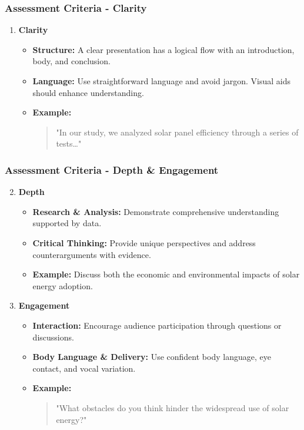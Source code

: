\documentclass[aspectratio=169]{beamer}
\begin{document}
\begin{frame}[fragile]
    \frametitle{Assessment Criteria - Clarity}
    \begin{enumerate}
        \item \textbf{Clarity}  
        \begin{itemize}
            \item \textbf{Structure:} A clear presentation has a logical flow with an introduction, body, and conclusion.
            \item \textbf{Language:} Use straightforward language and avoid jargon. Visual aids should enhance understanding.
            \item \textbf{Example:} 
            \begin{quote}
                "In our study, we analyzed solar panel efficiency through a series of tests…"
            \end{quote}
        \end{itemize}
    \end{enumerate}
\end{frame}

\begin{frame}[fragile]
    \frametitle{Assessment Criteria - Depth \& Engagement}
    \begin{enumerate}
        \setcounter{enumi}{1} %
        \item \textbf{Depth}  
        \begin{itemize}
            \item \textbf{Research \& Analysis:} Demonstrate comprehensive understanding supported by data.
            \item \textbf{Critical Thinking:} Provide unique perspectives and address counterarguments with evidence.
            \item \textbf{Example:} Discuss both the economic and environmental impacts of solar energy adoption.
        \end{itemize}

        \item \textbf{Engagement}  
        \begin{itemize}
            \item \textbf{Interaction:} Encourage audience participation through questions or discussions.
            \item \textbf{Body Language \& Delivery:} Use confident body language, eye contact, and vocal variation.
            \item \textbf{Example:} 
            \begin{quote}
                "What obstacles do you think hinder the widespread use of solar energy?"
            \end{quote}
        \end{itemize}
    \end{enumerate}
\end{frame}
\end{document}
